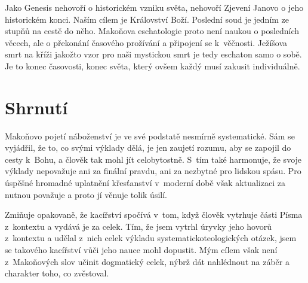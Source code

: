 Jako Genesis nehovoří o historickém vzniku světa, nehovoří Zjevení Janovo o jeho
historickém konci. Naším cílem je Království Boží. Poslední soud je jedním ze
stupňů na cestě do něho. Makoňova eschatologie proto není naukou o posledních
věcech, ale o překonání časového prožívání a připojení se k~věčnosti. Ježíšova
smrt na kříži jakožto vzor pro naši mystickou smrt je tedy eschaton samo o sobě.
Je to konec časovosti, konec světa, který ovšem každý musí zakusit individuálně.

\section{Shrnutí}

Makoňovo pojetí náboženství je ve své podstatě nesmírně systematické. Sám se
vyjádřil, že to, co svými výklady dělá, je jen zaujetí rozumu, aby se zapojil do
cesty k~Bohu, a člověk tak mohl jít celobytostně. S~tím také harmonuje, že svoje
výklady nepovažuje ani za finální pravdu, ani za nezbytné pro lidskou spásu. Pro
úspěšné hromadné uplatnění křesťanství v~moderní době však aktualizaci za nutnou
považuje a proto jí věnuje tolik úsilí.

Zmiňuje opakovaně, že kacířství spočívá v~tom, když člověk vytrhuje části Písma
z~kontextu a vydává je za celek. Tím, že jsem vytrhl úryvky jeho hovorů
z~kontextu a udělal z~nich celek výkladu systematicko\-teologických otázek, jsem
se takového kacířství vůči jeho nauce mohl dopustit. Mým cílem však není
z~Makoňových slov učinit dogmatický celek, nýbrž dát nahlédnout na záběr a
charakter toho, co zvěstoval.
